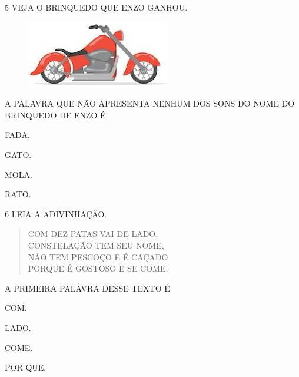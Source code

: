 \num{5} VEJA O BRINQUEDO QUE ENZO GANHOU.

\begin{figure}[H]
\centering
\includegraphics[width=.4\textwidth]{media/image245.jpg}
\end{figure}


A PALAVRA QUE NÃO APRESENTA NENHUM DOS SONS DO NOME DO BRINQUEDO DE ENZO É

\begin{multicols}{2}
\begin{escolha}
\item FADA.

\item GATO.

\item MOLA.

\item RATO.
\end{escolha}
\end{multicols}

\num{6} LEIA A ADIVINHAÇÃO. 

\begin{myquote}
\begin{verse}
COM DEZ PATAS VAI DE LADO,\\
CONSTELAÇÃO TEM SEU NOME,\\
NÃO TEM PESCOÇO E É CAÇADO\\
PORQUE É GOSTOSO E SE COME.
\end{verse}

\end{myquote}

A PRIMEIRA PALAVRA DESSE TEXTO É

\begin{escolha}
\item COM.

\item LADO.

\item COME.

\item POR QUE.
\end{escolha}


